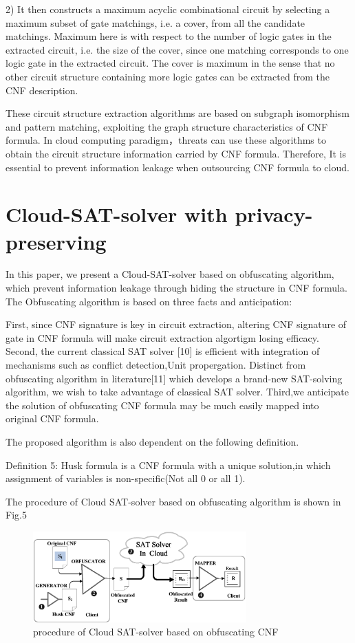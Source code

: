 \documentclass[runningheads,a4paper]{llncs}
\begin{document}
2) It then constructs a maximum acyclic combinational circuit by selecting a maximum subset of gate matchings, i.e. a cover, from all the candidate matchings. Maximum here is with respect to the number of logic gates in the extracted circuit, i.e. the size of the cover, since one matching corresponds to one logic gate in the extracted circuit. The cover is maximum in the sense that no other circuit structure containing more logic gates can be extracted from the CNF description.

These circuit structure extraction algorithms are based on subgraph isomorphism and pattern matching, exploiting the graph structure characteristics of CNF formula. In cloud computing paradigm，threats can use these algorithms to obtain the circuit structure information carried by CNF formula. Therefore, It is essential to prevent information leakage when outsourcing CNF formula to cloud.

\section{Cloud-SAT-solver with privacy-preserving}

In this paper, we present a Cloud-SAT-solver based on obfuscating algorithm, which prevent information leakage through hiding the structure in CNF formula.
The Obfuscating algorithm is based on three facts and anticipation:

First, since CNF signature is key in circuit extraction, altering CNF signature of gate in CNF formula will make circuit extraction algortigm losing efficacy.
Second, the current classical SAT solver [10] is efficient with integration of mechanisms such as conflict detection,Unit propergation.
Distinct from obfuscating algorithm in literature[11] which develops a brand-new SAT-solving algorithm, we wish to take advantage of classical SAT solver.
Third,we anticipate the solution of obfuscating CNF formula may be much easily mapped into original CNF formula.

The proposed algorithm is also dependent on the following definition.

\noindent Definition 5: Husk formula is a CNF formula with a unique solution,in which assignment of variables is non-specific(Not all 0 or all 1).

The procedure of Cloud SAT-solver based on obfuscating algorithm is shown in Fig.5
\begin{figure}
\centering
\includegraphics[width=8.2cm]{a5}
\caption{procedure of Cloud SAT-solver based on obfuscating CNF}
\end{figure}
\end{document}
